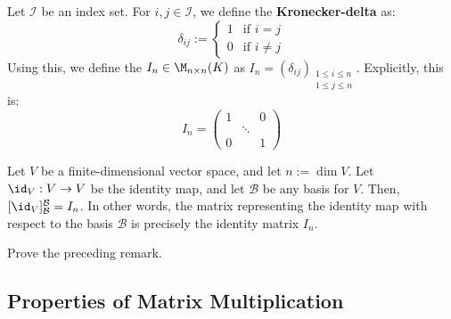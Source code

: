 Let $\mathcal{I}$ be an index set. For $i, j \in \mathcal{I}$, we define the \textbf{Kronecker-delta} as:
\begin{equation*}
    \delta_{ij} := \begin{cases} 1 & \text{if } i = j \\ 0 & \text{if } i \neq j \end{cases}
\end{equation*}
Using this, we define the  $I_n \in \M_{n \times n}(K)$ as $I_n = (\delta_{ij})_{\substack{1 \le i \le n \\ 1 \le j \le n}}$. Explicitly, this is:
\begin{equation*}
    I_n = \begin{pmatrix} 1 & & 0 \\ & \ddots & \\ 0 & & 1 \end{pmatrix}
\end{equation*}

\begin{remark}
Let $V$ be a finite-dimensional vector space, and let $n := \dim V$. Let $\id_V: V \to V$ be the identity map, and let $\mathcal{B}$ be any basis for $V$. Then, $[\id_V]_{\mathcal{B}}^{\mathcal{B}} = I_n$. In other words, the matrix representing the identity map with respect to the basis $\mathcal{B}$ is precisely the identity matrix $I_n$.
\end{remark}

\begin{exercise}
Prove the preceding remark.
\end{exercise}

\subsection{Properties of Matrix Multiplication}

